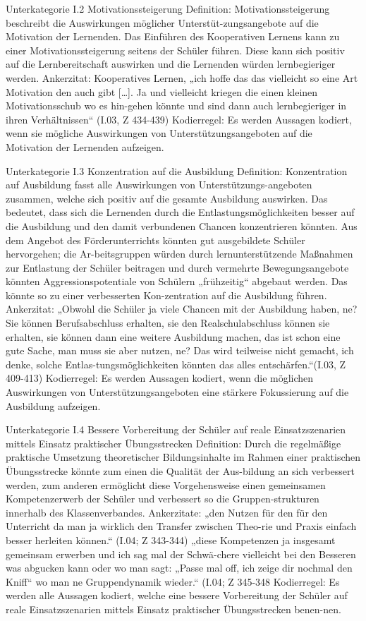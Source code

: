 Unterkategorie I.2 Motivationssteigerung 
Definition: Motivationssteigerung beschreibt die Auswirkungen möglicher Unterstüt-zungsangebote auf die Motivation der Lernenden. Das Einführen des Kooperativen Lernens kann zu einer Motivationssteigerung seitens der Schüler führen. Diese kann sich positiv auf die Lernbereitschaft auswirken und die Lernenden würden lernbegieriger werden.
Ankerzitat: Kooperatives Lernen, „ich hoffe das das vielleicht so eine Art Motivation den auch gibt […]. Ja und vielleicht kriegen die einen kleinen Motivationsschub wo es hin-gehen könnte und sind dann auch lernbegieriger in ihren Verhältnissen“ (I.03, Z 434-439)
Kodierregel: Es werden Aussagen kodiert, wenn sie mögliche Auswirkungen von Unterstützungsangeboten auf die Motivation der Lernenden aufzeigen.

Unterkategorie I.3 Konzentration auf die Ausbildung 
Definition: Konzentration auf Ausbildung fasst alle Auswirkungen von Unterstützungs-angeboten zusammen, welche sich positiv auf die gesamte Ausbildung auswirken. Das bedeutet, dass sich die Lernenden durch die Entlastungsmöglichkeiten besser auf die Ausbildung und den damit verbundenen Chancen konzentrieren könnten. Aus dem Angebot des Förderunterrichts könnten gut ausgebildete Schüler hervorgehen; die Ar-beitsgruppen würden durch lernunterstützende Maßnahmen zur Entlastung der Schüler beitragen und durch vermehrte Bewegungsangebote könnten Aggressionspotentiale von Schülern „frühzeitig“ abgebaut werden. Das könnte so zu einer verbesserten Kon-zentration auf die Ausbildung führen.
Ankerzitat: „Obwohl die Schüler ja viele Chancen mit der Ausbildung haben, ne? Sie können Berufsabschluss erhalten, sie den Realschulabschluss können sie erhalten, sie können dann eine weitere Ausbildung machen, das ist schon eine gute Sache, man muss sie aber nutzen, ne? Das wird teilweise nicht gemacht, ich denke, solche Entlas-tungsmöglichkeiten könnten das alles entschärfen.“(I.03, Z 409-413)
Kodierregel: Es werden Aussagen kodiert, wenn die möglichen Auswirkungen von Unterstützungsangeboten eine stärkere Fokussierung auf die Ausbildung aufzeigen. 

Unterkategorie I.4 Bessere Vorbereitung der Schüler auf reale Einsatzszenarien mittels Einsatz praktischer Übungsstrecken
Definition: Durch die regelmäßige praktische Umsetzung theoretischer Bildungsinhalte im Rahmen einer praktischen Übungsstrecke könnte zum einen die Qualität der Aus-bildung an sich verbessert werden, zum anderen ermöglicht diese Vorgehensweise einen gemeinsamen Kompetenzerwerb der Schüler und verbessert so die Gruppen-strukturen innerhalb des Klassenverbandes.
Ankerzitate: 
„den Nutzen für den für den Unterricht da man ja wirklich den Transfer zwischen Theo-rie und Praxis einfach besser herleiten können.“ (I.04; Z 343-344)
„diese Kompetenzen ja insgesamt gemeinsam erwerben und ich sag mal der Schwä-chere vielleicht bei den Besseren was abgucken kann oder wo man sagt: „Passe mal off, ich zeige dir nochmal den Kniff“ wo man ne Gruppendynamik wieder.“ (I.04; Z 345-348
Kodierregel:  Es werden alle Aussagen kodiert, welche eine bessere Vorbereitung der Schüler auf reale Einsatzszenarien mittels Einsatz praktischer Übungsstrecken benen-nen.
